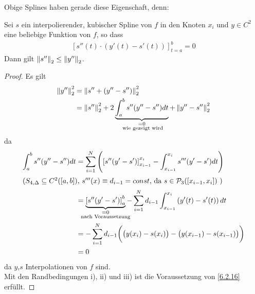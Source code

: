 Obige Splines haben gerade diese Eigenschaft, denn:

\begin{Satze}\label{6.2.16}
  Sei $s$ ein interpolierender, kubischer Spline von $f$
  in den Knoten $x_i $ und $y\in C^2$ eine beliebige Funktion
  von $f$, so dass 
  \begin{gather*}
    \left[s''(t)\cdot(y'(t)-s'(t))\right]_{t=a}^{b}=0
  \end{gather*}
  Dann gilt $\nn[s'']_2 \leq \nn[y'']_2$.

  \begin{proof}
    Es gilt
    \begin{align*}
      \nn[y'']_2^2 &= \nn[s''+(y''-s'')]_2^2\\
                   &= \nn[s'']_2^2
                     + 2\underbrace{\int_{a}^{b}s''(y''-s'')dt}_{
                     \mathclap{\substack{=0 \\ \text{ wie gezeigt wird}}}
      }
      + \nn[y''-s'']_2^2
    \end{align*}
    da
    \begin{align*}
      \int_{a}^{b} s''(y''-s'')dt &= \sum_{i=1}^{N}\left(\left[
                                    s''(y'-s')\right]_{x_{i-1}}^{x_i}
                                    -\int_{x_{i-1}}^{x_i}s'''(y'-s')dt\right)\\
      \intertext{($S_{4,\Delta}\subseteq C^2([a,b])$, 
      $s'''(x)\equiv d_{i-1}=const$, 
      da 
      $s\in\p_3([x_{i-1},x_i])$ )
      }
                                  &= \underbrace{\left[ s''(y'-s')\right]_{a}^{b}}_{
                                    \mathclap{\substack{ =0 \\ \text{ nach Voraussetzung } }}
      }
      -\sum_{i=1}^{N} d_{i-1}
      \int_{x_{i-1}}^{x_i} \left(y'(t)-s'(t)\right) dt\\
                                  &=-\sum_{i=1}^N d_{i-1}\bigg(\big(y(x_i)-s(x_i)\big)
                                    - \big(y(x_{i-1})-s(x_{i-1})\big)\bigg) \\
                                  &=0
    \end{align*}
    da $y$,$s$ Interpolationen von $f$ sind.\\
    Mit den Randbedingungen i), ii) und iii) 
    ist die Voraussetzung von \ref{6.2.16} erfüllt.
  \end{proof}
\end{Satze}

